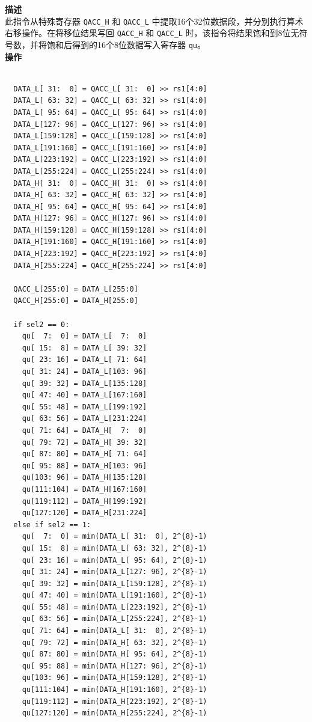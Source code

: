 \textbf{描述}\\
此指令从特殊寄存器 \lstinline{QACC_H} 和 \lstinline{QACC_L} 中提取16个32位数据段，并分别执行算术右移操作。在将移位结果写回 \lstinline{QACC_H} 和 \lstinline{QACC_L} 时，该指令将结果饱和到8位无符号数，并将饱和后得到的16个8位数据写入寄存器 \lstinline{qu}。\\
\textbf{操作}
\begin{lstlisting}

  DATA_L[ 31:  0] = QACC_L[ 31:  0] >> rs1[4:0]
  DATA_L[ 63: 32] = QACC_L[ 63: 32] >> rs1[4:0]
  DATA_L[ 95: 64] = QACC_L[ 95: 64] >> rs1[4:0]
  DATA_L[127: 96] = QACC_L[127: 96] >> rs1[4:0]
  DATA_L[159:128] = QACC_L[159:128] >> rs1[4:0]
  DATA_L[191:160] = QACC_L[191:160] >> rs1[4:0]
  DATA_L[223:192] = QACC_L[223:192] >> rs1[4:0]
  DATA_L[255:224] = QACC_L[255:224] >> rs1[4:0]
  DATA_H[ 31:  0] = QACC_H[ 31:  0] >> rs1[4:0]
  DATA_H[ 63: 32] = QACC_H[ 63: 32] >> rs1[4:0]
  DATA_H[ 95: 64] = QACC_H[ 95: 64] >> rs1[4:0]
  DATA_H[127: 96] = QACC_H[127: 96] >> rs1[4:0]
  DATA_H[159:128] = QACC_H[159:128] >> rs1[4:0]
  DATA_H[191:160] = QACC_H[191:160] >> rs1[4:0]
  DATA_H[223:192] = QACC_H[223:192] >> rs1[4:0]
  DATA_H[255:224] = QACC_H[255:224] >> rs1[4:0]

  QACC_L[255:0] = DATA_L[255:0]
  QACC_H[255:0] = DATA_H[255:0]

  if sel2 == 0:
    qu[  7:  0] = DATA_L[  7:  0]
    qu[ 15:  8] = DATA_L[ 39: 32]
    qu[ 23: 16] = DATA_L[ 71: 64]
    qu[ 31: 24] = DATA_L[103: 96]
    qu[ 39: 32] = DATA_L[135:128]
    qu[ 47: 40] = DATA_L[167:160]
    qu[ 55: 48] = DATA_L[199:192]
    qu[ 63: 56] = DATA_L[231:224]
    qu[ 71: 64] = DATA_H[  7:  0]
    qu[ 79: 72] = DATA_H[ 39: 32]
    qu[ 87: 80] = DATA_H[ 71: 64]
    qu[ 95: 88] = DATA_H[103: 96]
    qu[103: 96] = DATA_H[135:128]
    qu[111:104] = DATA_H[167:160]
    qu[119:112] = DATA_H[199:192]
    qu[127:120] = DATA_H[231:224]
  else if sel2 == 1:
    qu[  7:  0] = min(DATA_L[ 31:  0], 2^{8}-1)
    qu[ 15:  8] = min(DATA_L[ 63: 32], 2^{8}-1)
    qu[ 23: 16] = min(DATA_L[ 95: 64], 2^{8}-1)
    qu[ 31: 24] = min(DATA_L[127: 96], 2^{8}-1)
    qu[ 39: 32] = min(DATA_L[159:128], 2^{8}-1)
    qu[ 47: 40] = min(DATA_L[191:160], 2^{8}-1)
    qu[ 55: 48] = min(DATA_L[223:192], 2^{8}-1)
    qu[ 63: 56] = min(DATA_L[255:224], 2^{8}-1)
    qu[ 71: 64] = min(DATA_L[ 31:  0], 2^{8}-1)
    qu[ 79: 72] = min(DATA_H[ 63: 32], 2^{8}-1)
    qu[ 87: 80] = min(DATA_H[ 95: 64], 2^{8}-1)
    qu[ 95: 88] = min(DATA_H[127: 96], 2^{8}-1)
    qu[103: 96] = min(DATA_H[159:128], 2^{8}-1)
    qu[111:104] = min(DATA_H[191:160], 2^{8}-1)
    qu[119:112] = min(DATA_H[223:192], 2^{8}-1)
    qu[127:120] = min(DATA_H[255:224], 2^{8}-1)

\end{lstlisting}

